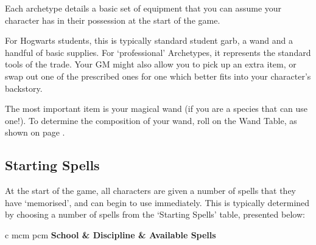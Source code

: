 Each archetype details a basic set of equipment that you can assume your character has in their possession at the start of the game. 

For Hogwarts students, this is typically standard student garb, a wand and a handful of basic supplies. For `professional' Archetypes, it represents the standard tools of the trade. Your GM might also allow you to pick up an extra item, or swap out one of the prescribed ones for one which better fits into your character's backstory. 

The most important item is your magical wand (if you are a species that can use one!). To determine the composition of your wand, roll on the Wand Table, as shown on page \pageref{S:Wands}. 


\subsection*{Starting Spells}\label{S:BasicSpells}

At the start of the game, all characters are given a number of spells that they have `memorised', and can begin to use immediately. This is typically determined by choosing a number of spells from the `Starting Spells' table, presented below:

\begin{center}
	\small
	\begin{rndtable}{c m{\xS cm} p{\wS cm}}
		\bf School	&	\bf Discipline	&	\bf Available Spells
		\\
		\\
		\\
		\\
		\\ 
		\\
		\\
	\end{rndtable}
	\normalsize
\end{center}

